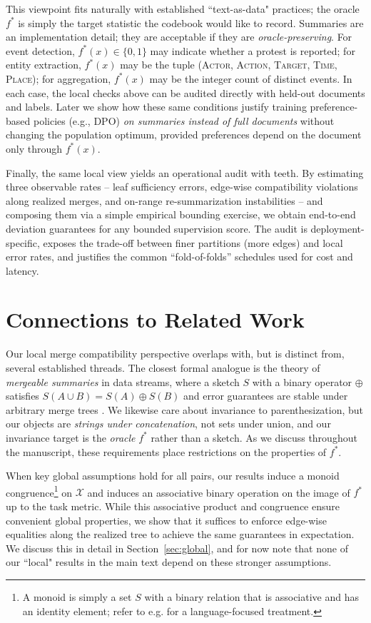 \documentclass[11pt]{article}
\newcommand{\Strings}{\mathcal{X}}       %
\newcommand{\fstar}{f^*}               %
\newcommand{\concat}{\oplus}                    %
\begin{document}
This viewpoint fits naturally with established ``text-as-data" practices; the oracle $\fstar$ is simply the target statistic the codebook would like to record. Summaries are an implementation detail; they are acceptable if they are \emph{oracle-preserving}. For event detection, $\fstar(x)\in\{0,1\}$ may indicate whether a protest is reported; for entity extraction, $\fstar(x)$ may be the tuple \textsc{(Actor, Action, Target, Time, Place)}; for aggregation, $\fstar(x)$ may be the integer count of distinct events. In each case, the local checks above can be audited directly with held-out documents and labels. Later we show how these same conditions justify training preference-based policies (e.g., DPO) \emph{on summaries instead of full documents} without changing the population optimum, provided preferences depend on the document only through $\fstar(x)$.

Finally, the same local view yields an operational audit with teeth. By estimating three observable rates -- leaf sufficiency errors, edge-wise compatibility violations along realized merges, and on-range re-summarization instabilities -- and composing them via a simple empirical bounding exercise, we obtain end-to-end deviation guarantees for any bounded supervision score. The audit is deployment-specific, exposes the trade-off between finer partitions (more edges) and local error rates, and justifies the common ``fold-of-folds'' schedules used for cost and latency. 



\section{Connections to Related Work}\label{sec:related}

Our local merge compatibility perspective overlaps with, but is distinct from, several established threads. The closest formal analogue is the theory of \emph{mergeable summaries} in data streams, where a sketch $S$ with a binary operator $\concat$ satisfies $S(A\cup B)=S(A)\concat S(B)$ and error guarantees are stable under arbitrary merge trees \citep{Agarwal2013MergeableTODS}. We likewise care about invariance to parenthesization, but our objects are \emph{strings under concatenation}, not sets under union, and our invariance target is the \emph{oracle} $\fstar$ rather than a sketch. As we discuss throughout the manuscript, these requirements place restrictions on the properties of $\fstar$.


When key global assumptions hold for all pairs, our results induce a monoid congruence\footnote{A monoid is simply a set $S$ with a binary relation that is associative and has an identity element; refer to e.g. \cite{Eilenberg1974} for a language-focused treatment.} on $\Strings$ and induces an associative binary operation on the image of $\fstar$ up to the task metric. While this associative product and congruence ensure convenient global properties, we show that it suffices to enforce edge-wise equalities along the realized tree to achieve the same guarantees in expectation. We discuss this in detail in Section~\ref{sec:global}, and for now note that none of our ``local" results in the main text depend on these stronger assumptions. 
\end{document}
